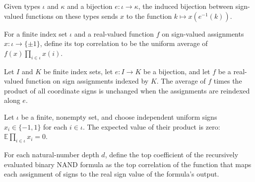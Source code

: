 \begin{definition}
\label{FABL.piReindexEquiv}
\leanok
{}
Given types $\iota$ and $\kappa$ and a bijection $e:\iota\to\kappa$, the induced
bijection between sign-valued functions on these types sends $x$ to the function
$k\mapsto x(e^{-1}(k))$.
\end{definition}

\begin{definition}
\label{FABL.topCorrelation}
\leanok
{}
For a finite index set $\iota$ and a real-valued function $f$ on sign-valued assignments
$x:\iota\to\{\pm1\}$, define its top correlation to be the uniform average of
$f(x)\prod_{i\in\iota}x(i)$.
\end{definition}

\begin{theorem}
\label{FABL.topCorrelation_reindex}
\leanok
{}
Let $I$ and $K$ be finite index sets, let $e:I\to K$ be a bijection, and let $f$ be a
real-valued function on sign assignments indexed by $K$. The average of $f$ times the
product of all coordinate signs is unchanged when the assignments are reindexed along
$e$.
\end{theorem}

\begin{theorem}
\label{FABL.expect_fullParity_eq_zero}
\leanok
{}
Let $\iota$ be a finite, nonempty set, and choose independent uniform signs
$x_i\in\{-1,1\}$ for each $i\in\iota$. The expected value of their product is zero:
$\mathbb E\prod_{i\in\iota}x_i=0$.
\end{theorem}

\begin{definition}
\label{FABL.addressRecursiveNANDTopCoeff}
\leanok
{}
For each natural-number depth $d$, define the top coefficient of the recursively
evaluated binary NAND formula as the top correlation of the function that maps each
assignment of signs to the real sign value of the formula's output.
\end{definition}

